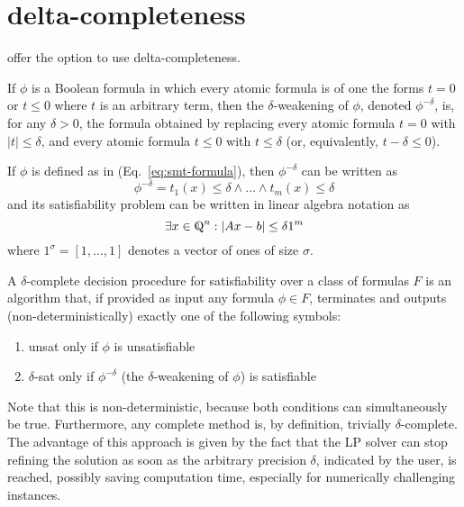 \documentclass[runningheads]{llncs}
\begin{document}
\section{delta-completeness}

\dlinear offer the option to use delta-completeness.

\begin{definition}
    If $\phi$ is a Boolean formula in which every atomic formula is of one the forms $t = 0$ or $t \le 0$ where $t$ is an arbitrary term, then the $\delta$-weakening of $\phi$, denoted $\phi^{-\delta}$, is, for any $\delta > 0$, the formula obtained by replacing every atomic formula $t = 0$ with $|t| \le \delta$, and every atomic formula $t \le 0$ with $t \le \delta$ (or, equivalently, $t - \delta \le 0$).
\end{definition}
If $\phi$ is defined as in (Eq.~\ref{eq:smt-formula}), then $\phi^{-\delta}$ can be written as
\begin{equation*}
    \phi^{-\delta} = t_1(x) \le \delta \land \ldots \land t_m(x) \le \delta
\end{equation*}
and its satisfiability problem can be written in linear algebra notation as
\begin{equation}
    \label{eq:delta-sat}
    \exists x \in \bbbq^n : |Ax - b| \le \delta 1^m
\end{equation}
where $1^\sigma = [1, \ldots, 1]$ denotes a vector of ones of size $\sigma$.
\begin{definition}
    A $\delta$-complete decision procedure for satisfiability over a class of formulas $F$ is an algorithm that, if provided as input any formula $\phi \in F$, terminates and outputs (non-deterministically) exactly one of the following symbols:
    \begin{enumerate}
        \item unsat only if $\phi$ is unsatisfiable
        \item $\delta$-sat only if $\phi^{-\delta}$ (the $\delta$-weakening of $\phi$) is satisfiable
    \end{enumerate}
\end{definition}
Note that this is non-deterministic, because both conditions can simultaneously be true.
Furthermore, any complete method is, by definition, trivially $\delta$-complete.
The advantage of this approach is given by the fact that the LP solver can stop refining the solution as soon as the arbitrary precision $\delta$, indicated by the user, is reached, possibly saving computation time, especially for numerically challenging instances.
\end{document}
